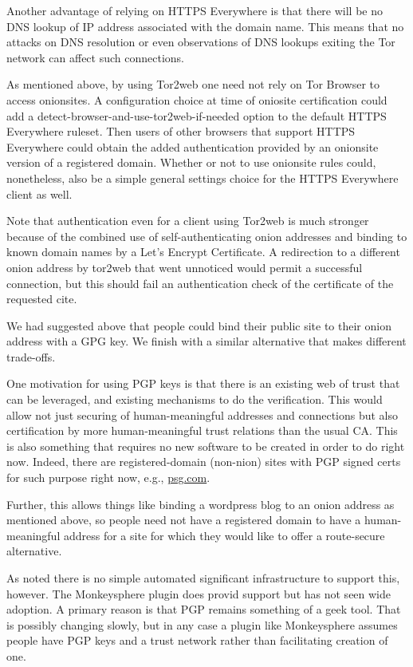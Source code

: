 \documentclass[10pt, conference, compsocconf]{styles/IEEEtran}
\begin{document}
Another advantage of relying on HTTPS Everywhere is that there will
be no DNS lookup of IP address associated with the domain name.
This means that no attacks on DNS resolution or even observations
of DNS lookups exiting the Tor network can affect such connections.

As mentioned above, by using Tor2web one need not rely on Tor Browser
to access onionsites. A configuration choice at time of oniosite
certification could add a detect-browser-and-use-tor2web-if-needed
option to the default HTTPS Everywhere ruleset. Then users of other
browsers that support HTTPS Everywhere could obtain the added
authentication provided by an onionsite version of a registered
domain. Whether or not to use onionsite rules could, nonetheless, also
be a simple general settings choice for the HTTPS Everywhere client as
well.

Note that authentication even for a client using Tor2web is much
stronger because of the combined use of self-authenticating onion
addresses and binding to known domain names by a Let's Encrypt
Certificate.  A redirection to a different onion address by tor2web
that went unnoticed would permit a successful connection, but this
should fail an authentication check of the certificate of the
requested cite.


We had suggested above that people could bind their public site to
their onion address with a GPG key.  We finish with a similar alternative
that makes different trade-offs.

One motivation for using PGP keys is that there is an existing web of
trust that can be leveraged, and existing mechanisms to do the
verification.  This would allow not just securing of human-meaningful
addresses and connections but also certification by more
human-meaningful trust relations than the usual CA.  This is also
something that requires no new software to be created in order to do
right now. Indeed, there are registered-domain (non-nion) sites with
PGP signed certs for such purpose right now, e.g., \url{psg.com}.

Further, this allows things like binding a wordpress blog to an onion
address as mentioned above, so people need not have a registered domain
to have a human-meaningful address for a site for which
they would like to offer a route-secure alternative.

As noted there is no simple automated significant infrastructure to
support this, however. The Monkeysphere plugin does provid support but
has not seen wide adoption.  A primary reason is that PGP remains
something of a geek tool. That is possibly changing slowly, but in any
case a plugin like Monkeysphere assumes people have PGP keys and a
trust network rather than facilitating creation of one.
\end{document}
